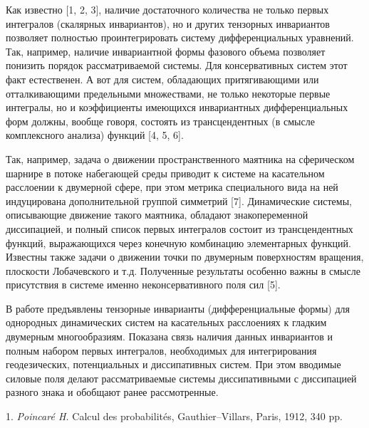 
\vzmscaption



Как известно [1, 2, 3], наличие достаточного количества не только первых интегралов (скалярных инвариантов), но и других тензорных инвариантов позволяет полностью проинтегрировать систему дифференциальных уравнений. Так, например, наличие инвариантной формы фазового объема позволяет понизить порядок рассматриваемой системы. Для консервативных систем этот факт естественен. А вот для систем, обладающих притягивающими или отталкивающими предельными множествами, не только некоторые первые интегралы, но и коэффициенты имеющихся инвариантных дифференциальных форм должны, вообще говоря, состоять из трансцендентных (в смысле комплексного анализа) функций [4, 5, 6].

Так, например, задача о движении пространственного маятника на сферическом шарнире в потоке набегающей среды приводит к системе на касательном расслоении к двумерной сфере, при этом метрика специального вида на ней индуцирована дополнительной группой симметрий [7]. Динамические системы, описывающие движение такого маятника, обладают знакопеременной диссипацией, и полный список первых интегралов состоит из трансцендентных функций, выражающихся через конечную комбинацию элементарных функций. Известны также задачи о движении точки по двумерным поверхностям вращения, плоскости Лобачевского и т.д. Полученные результаты особенно важны в смысле присутствия в системе именно неконсервативного поля сил [5].

В работе предъявлены тензорные инварианты (дифференциальные формы) для однородных динамических систем на касательных расслоениях к гладким двумерным многообразиям. Показана связь наличия данных инвариантов и полным набором первых интегралов, необходимых для интегрирования геодезических, потенциальных и диссипативных систем. При этом вводимые силовые поля делают рассматриваемые системы диссипативными с диссипацией разного знака и обобщают ранее рассмотренные.


\litlist

1. {\it Poincar\'{e} H.} Calcul des probabilit\'{e}s, Gauthier--Villars, Paris, 1912, 340 pp.

